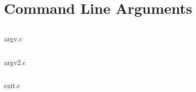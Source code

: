 \clearpage
\section{Command Line Arguments}
\begin{code}[!htbp]
    \inputminted[linenos]{c}{codes/src2/argv.c}
    \caption{argv.c}
\end{code}

\begin{code}[!htbp]
    \inputminted[linenos]{c}{codes/src2/argv2.c}
    \caption{argv2.c}
\end{code}

\begin{code}[!htbp]
    \inputminted[linenos]{c}{codes/src2/exit.c}
    \caption{exit.c}
\end{code}